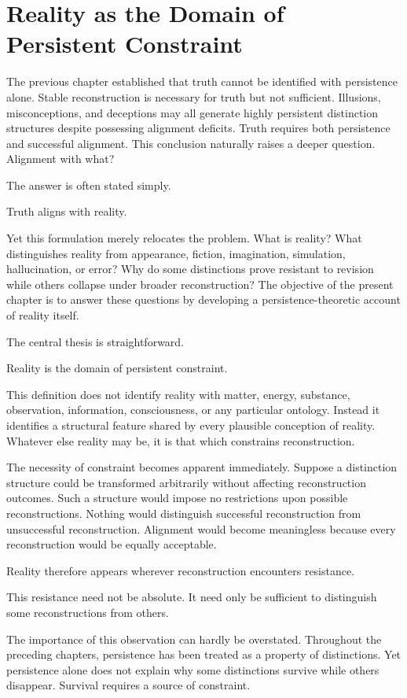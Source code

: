 \documentclass[12pt,oneside]{article}
\theoremstyle{definition}
\begin{document}
\section{Reality as the Domain of Persistent Constraint}

The previous chapter established that truth cannot be identified with persistence alone. Stable reconstruction is necessary for truth but not sufficient. Illusions, misconceptions, and deceptions may all generate highly persistent distinction structures despite possessing alignment deficits. Truth requires both persistence and successful alignment. This conclusion naturally raises a deeper question. Alignment with what?

The answer is often stated simply.

Truth aligns with reality.

Yet this formulation merely relocates the problem. What is reality? What distinguishes reality from appearance, fiction, imagination, simulation, hallucination, or error? Why do some distinctions prove resistant to revision while others collapse under broader reconstruction? The objective of the present chapter is to answer these questions by developing a persistence-theoretic account of reality itself.

The central thesis is straightforward.

Reality is the domain of persistent constraint.

This definition does not identify reality with matter, energy, substance, observation, information, consciousness, or any particular ontology. Instead it identifies a structural feature shared by every plausible conception of reality. Whatever else reality may be, it is that which constrains reconstruction.

The necessity of constraint becomes apparent immediately. Suppose a distinction structure could be transformed arbitrarily without affecting reconstruction outcomes. Such a structure would impose no restrictions upon possible reconstructions. Nothing would distinguish successful reconstruction from unsuccessful reconstruction. Alignment would become meaningless because every reconstruction would be equally acceptable.

Reality therefore appears wherever reconstruction encounters resistance.

This resistance need not be absolute. It need only be sufficient to distinguish some reconstructions from others.

The importance of this observation can hardly be overstated. Throughout the preceding chapters, persistence has been treated as a property of distinctions. Yet persistence alone does not explain why some distinctions survive while others disappear. Survival requires a source of constraint.
\end{document}
